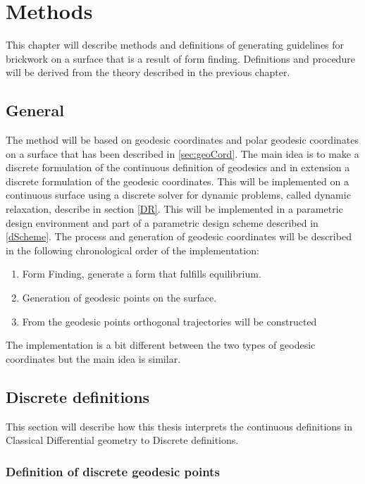 \chapter{Methods}


This chapter will describe methods and definitions of generating guidelines for brickwork on a surface that is a result of form finding. Definitions and procedure will be derived from the theory described in the previous chapter.   


\section{General}

The method will be based on geodesic coordinates and polar geodesic coordinates on a surface that has been described in \ref{sec:geoCord}. The main idea is to make a discrete formulation of the continuous definition of geodesics and in extension a discrete formulation of the geodesic coordinates. This will be implemented on a continuous surface using a discrete solver for dynamic problems, called dynamic relaxation, describe in section \ref{DR}. This will be implemented in a parametric design environment and part of a parametric design scheme described in \ref{dScheme}. The process and generation of geodesic coordinates will be described in the following chronological order of the implementation:
\vspace{5mm}
\begin{enumerate}
\item Form Finding, generate a form that fulfills equilibrium.
\item Generation of geodesic points on the surface.
\item From the geodesic points orthogonal trajectories will be constructed 
\end{enumerate}
\vspace{5mm}
The implementation is a bit different between the two types of geodesic coordinates but the main idea is similar.

\section{Discrete definitions}
This section will describe how this thesis interprets the continuous definitions in Classical Differential geometry to Discrete definitions. 
\subsection{Definition of discrete geodesic points}  \label{geopoint}



